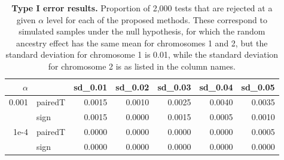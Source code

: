 \documentclass[11pt, letterpaper]{article}
\begin{document}
\begin{table}[ht]
\centering
\begin{tabular}{rlrrrrr}
  \hline
$\alpha$& & sd\_0.01 & sd\_0.02 & sd\_0.03 & sd\_0.04 & sd\_0.05 \\ 
  \hline
0.001&pairedT & 0.0015 & 0.0010 & 0.0025 & 0.0040 & 0.0035 \\ 
&sign & 0.0015 & 0.0000 & 0.0015 & 0.0005 & 0.0010 \\ \hline
 1e-4&pairedT & 0.0000 & 0.0000 & 0.0000 & 0.0000 & 0.0005 \\ 
  &sign & 0.0000 & 0.0000 & 0.0000 & 0.0000 & 0.0000 \\ 
   \hline
\end{tabular}
\caption{\textbf{Type I error results.} Proportion of 2,000 tests that are rejected at a given $\alpha$ level for each of the proposed methods. These correspond to simulated samples under the null hypothesis, for which the random ancestry effect has the same mean for chromosomes 1 and 2, but the standard deviation for chromosome 1 is 0.01, while the standard deviation for chromosome 2 is as listed in the column names.}
\end{table}
\end{document}
